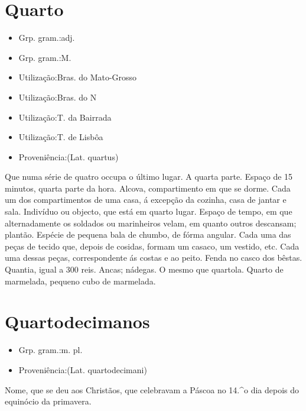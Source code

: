 \section{Quarto}
\begin{itemize}
\item {Grp. gram.:adj.}
\end{itemize}
\begin{itemize}
\item {Grp. gram.:M.}
\end{itemize}
\begin{itemize}
\item {Utilização:Bras. do Mato-Grosso}
\end{itemize}
\begin{itemize}
\item {Utilização:Bras. do N}
\end{itemize}
\begin{itemize}
\item {Utilização:T. da Bairrada}
\end{itemize}
\begin{itemize}
\item {Utilização:T. de Lisbôa}
\end{itemize}
\begin{itemize}
\item {Proveniência:(Lat. \textunderscore quartus\textunderscore )}
\end{itemize}
Que numa série de quatro occupa o último lugar.
A quarta parte.
Espaço de 15 minutos, quarta parte da hora.
Alcova, compartimento em que se dorme.
Cada um dos compartimentos de uma casa, á excepção da cozinha, casa de jantar e sala.
Indivíduo ou objecto, que está em quarto lugar.
Espaço de tempo, em que alternadamente os soldados ou marinheiros velam, em quanto outros descansam; plantão.
Espécie de pequena bala de chumbo, de fórma angular.
Cada uma das peças de tecido que, depois de cosidas, formam um casaco, um vestido, etc.
Cada uma dessas peças, correspondente ás costas e ao peito.
Fenda no casco dos bêstas.
Quantia, igual a 300 reis.
Ancas; nádegas.
O mesmo que \textunderscore quartola\textunderscore .
\textunderscore Quarto de marmelada\textunderscore , pequeno cubo de marmelada.
\section{Quartodecimanos}
\begin{itemize}
\item {Grp. gram.:m. pl.}
\end{itemize}
\begin{itemize}
\item {Proveniência:(Lat. \textunderscore quartodecimani\textunderscore )}
\end{itemize}
Nome, que se deu aos Christãos, que celebravam a Páscoa no 14.^o dia depois do equinócio da primavera.
